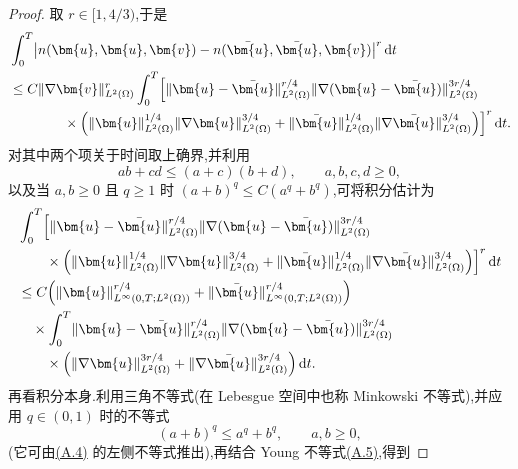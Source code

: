 \begin{lemma}[非线性对流项差的估计]
\begin{proof}
取 $r\in[1,4/3)$,于是
\begin{equation}\label{eq:time-dependent-convection-difference-time-integral}
\begin{aligned}
  &\int_0^T
    \bigl|n(\bm{u},\bm{u},\bm{v})
       -n(\bar{\bm{u}},\bar{\bm{u}},\bm{v})\bigr|^r\,\mathrm{d}t\\
  &\leq C\lVert\nabla\bm{v}\rVert_{L^2(\Omega)}^r
       \int_0^T\Bigl[
       \lVert\bm{u}-\bar{\bm{u}}\rVert_{L^2(\Omega)}^{r/4}
       \lVert\nabla(\bm{u}-\bar{\bm{u}})\rVert_{L^2(\Omega)}^{3r/4}\\
  &\qquad\qquad\times\Bigl(
       \lVert\bm{u}\rVert_{L^2(\Omega)}^{1/4}
       \lVert\nabla\bm{u}\rVert_{L^2(\Omega)}^{3/4}
       +\lVert\bar{\bm{u}}\rVert_{L^2(\Omega)}^{1/4}
       \lVert\nabla\bar{\bm{u}}\rVert_{L^2(\Omega)}^{3/4}
       \Bigr)\Bigr]^r\,\mathrm{d}t.
\end{aligned}
\end{equation}
对其中两个项关于时间取上确界,并利用
\[
  ab+cd\leq(a+c)(b+d),\qquad a,b,c,d\geq0,
\]
以及当 $a,b\geq0$ 且 $q\geq1$ 时 $(a+b)^q\leq C(a^q+b^q)$,可将积分估计为
\begin{equation}\label{eq:time-dependent-convection-difference-sup}
\begin{aligned}
  &\int_0^T\Bigl[
       \lVert\bm{u}-\bar{\bm{u}}\rVert_{L^2(\Omega)}^{r/4}
       \lVert\nabla(\bm{u}-\bar{\bm{u}})\rVert_{L^2(\Omega)}^{3r/4}\\
  &\qquad\times\Bigl(
       \lVert\bm{u}\rVert_{L^2(\Omega)}^{1/4}
       \lVert\nabla\bm{u}\rVert_{L^2(\Omega)}^{3/4}
       +\lVert\bar{\bm{u}}\rVert_{L^2(\Omega)}^{1/4}
       \lVert\nabla\bar{\bm{u}}\rVert_{L^2(\Omega)}^{3/4}
       \Bigr)\Bigr]^r\,\mathrm{d}t\\
  &\leq C\Bigl(
       \lVert\bm{u}\rVert_{L^\infty(0,T;L^2(\Omega))}^{r/4}
       +\lVert\bar{\bm{u}}\rVert_{L^\infty(0,T;L^2(\Omega))}^{r/4}
       \Bigr)\\
  &\quad\times\int_0^T
       \lVert\bm{u}-\bar{\bm{u}}\rVert_{L^2(\Omega)}^{r/4}
       \lVert\nabla(\bm{u}-\bar{\bm{u}})\rVert_{L^2(\Omega)}^{3r/4}\\
  &\qquad\times\Bigl(
       \lVert\nabla\bm{u}\rVert_{L^2(\Omega)}^{3r/4}
       +\lVert\nabla\bar{\bm{u}}\rVert_{L^2(\Omega)}^{3r/4}
       \Bigr)\,\mathrm{d}t.
\end{aligned}
\end{equation}
再看积分本身.利用三角不等式(在 Lebesgue 空间中也称 Minkowski 不等式),并应用 $q\in(0,1)$ 时的不等式
\[
  (a+b)^q\leq a^q+b^q,\qquad a,b\geq0,
\]
(它可由\hyperref[eq:appendix-a-4]{(A.4)} 的左侧不等式推出),再结合 Young 不等式\hyperref[eq:appendix-a-5]{(A.5)},得到

\end{proof}
\end{lemma}
